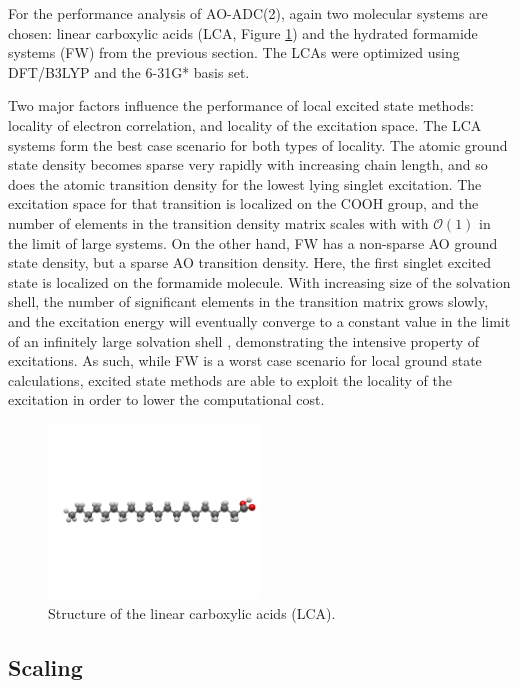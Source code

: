 For the performance analysis of AO-ADC(2), again two molecular systems are chosen: linear carboxylic acids (LCA, Figure \ref{fig:ACID}) and the hydrated formamide systems (FW) from the previous section. The LCAs were optimized using DFT/B3LYP and the 6-31G* basis set.

Two major factors influence the performance of local excited state methods: locality of electron correlation, and locality of the excitation space. The LCA systems form the best case scenario for both types of locality. The atomic ground state density becomes sparse very rapidly with increasing chain length, and so does the atomic transition density for the lowest lying singlet excitation. The excitation space for that transition is localized on the COOH group, and the number of elements in the transition density matrix scales with with $\mathcal{O}(1)$ in the limit of large systems. On the other hand, FW has a non-sparse AO ground state density, but a sparse AO transition density. Here, the first singlet excited state is localized on the formamide molecule. With increasing size of the solvation shell, the number of significant elements in the transition matrix grows slowly, and the excitation energy will eventually converge to a constant value in the limit of an infinitely large solvation shell \cite{Bau2017}, demonstrating the intensive property of excitations. As such, while FW is a worst case scenario for local ground state calculations, excited state methods are able to exploit the locality of the excitation in order to lower the computational cost.   

\begin{figure}
\centering
\includegraphics[width=0.5\textwidth]{Pics/acid.png}
\caption{Structure of the linear carboxylic acids (LCA).}
\label{fig:ACID}
\end{figure}

\subsection{Scaling}

